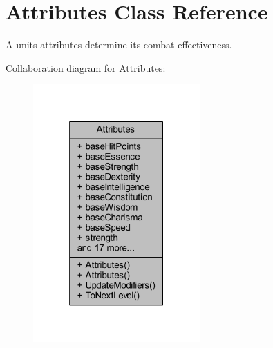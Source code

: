 \hypertarget{class_attributes}{}\section{Attributes Class Reference}
\label{class_attributes}


A unit\textquotesingle{}s attributes determine its combat effectiveness.  




Collaboration diagram for Attributes\+:
\nopagebreak
\begin{figure}[H]
\begin{center}
\leavevmode
\includegraphics[width=181pt]{class_attributes__coll__graph}
\end{center}
\end{figure}
